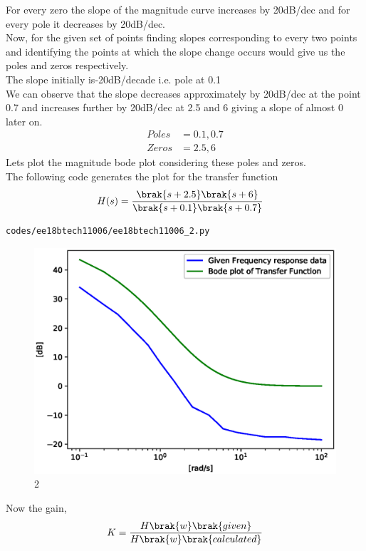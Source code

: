 \begin{enumerate}[label=\thesubsection.\arabic*.,ref=\thesubsection.\theenumi]
\begin{enumerate}
For every zero the slope of the magnitude curve increases by 20dB/dec and for every pole it decreases by 20dB/dec.\\
Now, for the given set of points finding slopes corresponding to every two points and identifying the points at which the slope change occurs would give us the poles and zeros respectively.\\
The slope initially is-20dB/decade i.e. pole at 0.1 \\
We can observe that the slope decreases approximately by 20dB/dec at the point 0.7 and increases further by 20dB/dec at 2.5 and 6 giving a slope of almost 0 later on. 
\begin{align}
Poles&= 0.1,0.7\\
Zeros&= 2.5,6
\end{align}
Lets plot the magnitude bode plot considering these poles and zeros.\\
The following code generates the plot for the transfer function
\begin{align}
H(s) &= \frac{\brak{s+2.5}\brak{s+6}}{\brak{s+0.1}\brak{s+0.7}}
\end{align}
\begin{lstlisting}
codes/ee18btech11006/ee18btech11006_2.py
\end{lstlisting}
\begin{figure}[!ht]
\centering
\includegraphics[width=\columnwidth]{./figs/ee18btech11006/ee18btech11006_2.eps}
\caption{2}
\label{fig:ee18btech11006_2}
\end{figure}
Now the gain,
\begin{align}
K=\frac{H\brak{w}\brak{given}}{H\brak{w}\brak{calculated}} 

\end{align}
\end{enumerate}
\end{enumerate}
